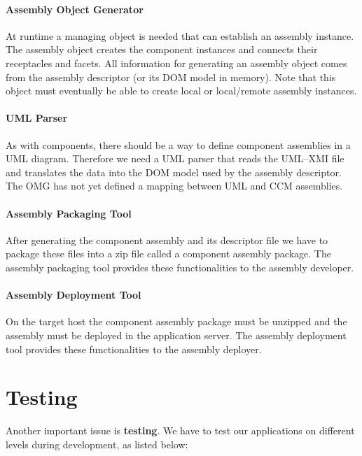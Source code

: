\paragraph{Assembly Object Generator}

At runtime a managing object is needed that can establish an assembly instance.
The assembly object creates the component instances and connects their
receptacles and facets. All information for generating an assembly object comes
from the assembly descriptor (or its DOM model in memory). Note that this object
must eventually be able to create local or local/remote assembly instances.

\paragraph{UML Parser}

As with components, there should be a way to define component assemblies in a
UML diagram. Therefore we need a UML parser that reads the UML--XMI file and
translates the data into the DOM model used by the assembly descriptor. The OMG
has not yet defined a mapping between UML and CCM assemblies.

\paragraph{Assembly Packaging Tool}

After generating the component assembly and its descriptor file we have to
package these files into a zip file called a component assembly package. The
assembly packaging tool provides these functionalities to the assembly
developer.

\paragraph{Assembly Deployment Tool}

On the target host the component assembly package must be unzipped and the
assembly must be deployed in the application server. The assembly deployment
tool provides these functionalities to the assembly deployer.

\section{Testing}

Another important issue is {\bf testing}. We have to test our applications on
different levels during development, as listed below:

